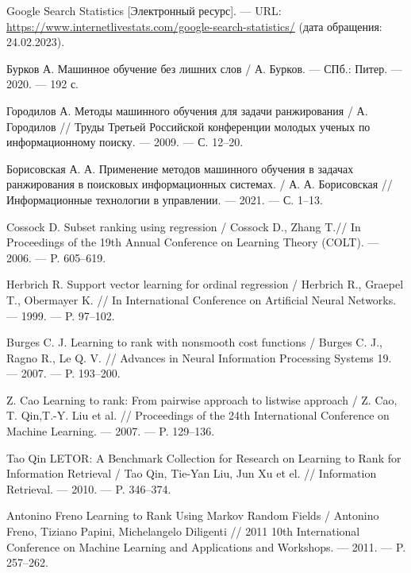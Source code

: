 
\renewcommand\bibname{СПИСОК ИСПОЛЬЗОВАННЫХ ИСТОЧНИКОВ}
\begin{thebibliography}{}

\setlength\bibindent{1.25cm}
\makeatletter
\let\old@biblabel\@biblabel
\def\@biblabel#1{\kern\bibindent\old@biblabel{#1}}
\makeatother

 Google Search Statistics [Электронный ресурс]. --- URL: \url{https://www.internetlivestats.com/google-search-statistics/} (дата обращения: 24.02.2023).

 Бурков А. Машинное обучение без лишних слов / А. Бурков. --- СПб.: Питер. --- 2020. --- 192 с.

 Городилов А. Методы машинного обучения для задачи ранжирования / А. Городилов // Труды Третьей Российской конференции молодых ученых по информационному поиску. --- 2009. --- С. 12--20.

 Борисовская А. А. Применение методов машинного обучения в задачах ранжирования в поисковых информационных системах. / А. А. Борисовская // Информационные технологии в управлении. --- 2021. --- С. 1--13.

 Cossock D. Subset ranking using regression / Cossock D., Zhang T.// In Proceedings of the 19th Annual Conference on Learning Theory (COLT). --- 2006. --- P. 605–619.

 Herbrich R. Support vector learning for ordinal regression / Herbrich R., Graepel T., Obermayer K. // In International Conference on Artificial Neural Networks. --- 1999. ---
P. 97--102.

 Burges C. J. Learning to rank with nonsmooth cost functions / Burges C. J., Ragno R., Le Q. V. // Advances in Neural Information Processing Systems 19. --- 2007. --- P. 193--200.

 Z. Cao Learning to rank: From pairwise approach to listwise approach / Z. Cao, T. Qin,T.-Y. Liu et al. // Proceedings of the 24th International Conference on Machine Learning. --- 2007. --- P. 129--136.

 Tao Qin LETOR: A Benchmark Collection for Research on
Learning to Rank for Information Retrieval / Tao Qin, Tie-Yan Liu, Jun Xu et el. // Information Retrieval. --- 2010. --- P. 346--374.

 Antonino Freno Learning to Rank Using Markov Random Fields / Antonino Freno, Tiziano Papini, Michelangelo Diligenti // 2011 10th International Conference on Machine Learning and Applications and Workshops. --- 2011. --- P. 257--262.


\end{thebibliography}

